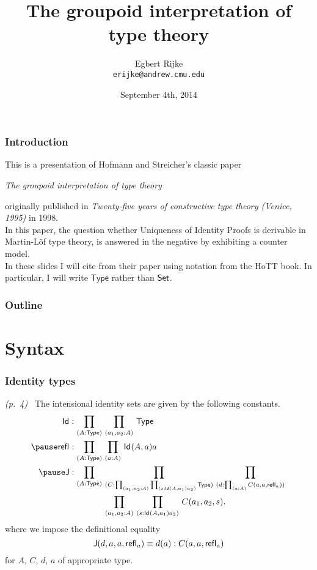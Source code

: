 \documentclass[handout,xcolor=dvipsnames]{beamer}
\title{The groupoid interpretation of type theory}
\author[Egbert]{Egbert Rijke \\ \texttt{erijke@andrew.cmu.edu}}
\date{September 4th, 2014}
\institute{Carnegie Mellon University}
\renewcommand\type{\mathsf{Type}}
\newcommand\J{\mathsf{J}}
\newcommand\quotepage[1]{\emph{(p.~#1)}~}
\begin{document}
\begin{frame}
  \titlepage
\end{frame}

\begin{frame}
  \frametitle{Introduction}
  This is a presentation of Hofmann and Streicher's classic paper
  \begin{center}
  \emph{The groupoid interpretation of type theory}
  \end{center}
  originally published in
  \emph{Twenty-five years of constructive type theory (Venice, 1995)}
  in 1998.
  \\
  \vspace{\baselineskip}
  In this paper, the question whether Uniqueness of Identity Proofs is derivable
  in Martin-L\"of type theory, is answered in the negative by exhibiting a
  counter model.
  \\
  \vspace{\baselineskip}
  In these slides I will cite from their paper using notation from the
  HoTT book. In particular, I will write $\type$ rather than $\mathsf{Set}$.
\end{frame}

\begin{frame}
  \frametitle{Outline}
  \tableofcontents[pausesections]
\end{frame}

\section{Syntax}

\begin{frame}
  \frametitle{Identity types}
\quotepage{4} The intensional identity sets are given by the following constants.
\begin{align*}
\idtypevar{} 
& :\prd{A:\type}{a_1,a_2:A}\type
  \\
\pause
\refl{}
& :\prd{A:\type}{a:A}\idtype{A}{a}{a}
  \\
\pause
\J 
& : \prd{A:\type}{C:\prd{a_1,a_2:A}{s:\idtype{A}{a_1}{a_2}}\type}{d:\prd{a:A}C(a,a,\refl{a})}
  \\ 
& {}\hspace{4em} \prd{a_1,a_2:A}{s:\idtype{A}{a_1}{a_2}}C(a_1,a_2,s).
\end{align*}
\pause
where we impose the definitional equality
\begin{equation*}
\J(d,a,a,\refl{a})\jdeq d(a) : C(a,a,\refl{a})
\end{equation*}
for $A$, $C$, $d$, $a$ of appropriate type.
\end{frame}
\end{document}
